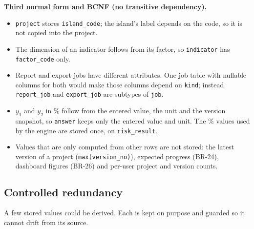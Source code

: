 \documentclass[11pt,a4paper]{article}
\newcommand{\tb}[1]{\texttt{#1}}
\begin{document}
\noindent\textbf{Third normal form and BCNF (no transitive dependency).}
\begin{itemize}
\item \tb{project} stores \tb{island\_code}; the island's label depends on the code, so it is not copied into the project.
\item The dimension of an indicator follows from its factor, so \tb{indicator} has \tb{factor\_code} only.
\item Report and export jobs have different attributes. One job table with nullable columns for both would make those columns depend on \tb{kind}; instead \tb{report\_job} and \tb{export\_job} are subtypes of \tb{job}.
\item $y_1$ and $y_2$ in \% follow from the entered value, the unit and the version snapshot, so \tb{answer} keeps only the entered value and unit. The \% values used by the engine are stored once, on \tb{risk\_result}.
\item Values that are only computed from other rows are not stored: the latest version of a project (\tb{max(version\_no)}), expected progress (BR-24), dashboard figures (BR-26) and per-user project and version counts.
\end{itemize}

\subsection{Controlled redundancy}
A few stored values could be derived. Each is kept on purpose and guarded so it cannot drift from its source.
\end{document}
